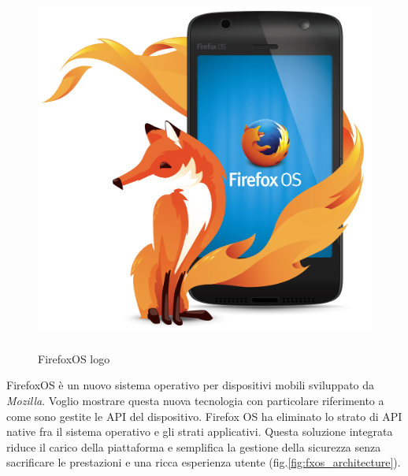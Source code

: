\begin{figure}
	\vspace{-55pt}
	\begin{center}
		\includegraphics[scale=0.075]{Figures/fxos-logo.png}
	\end{center}
	\vspace{0pt}
	\caption{\\FirefoxOS logo}
	\label{fig:fxos_logo}
	\vspace{0pt}
\end{figure}

FirefoxOS è un nuovo sistema operativo per dispositivi mobili sviluppato da \emph{Mozilla}. Voglio mostrare questa nuova tecnologia con particolare riferimento a come sono gestite le API del dispositivo. Firefox OS ha eliminato lo strato di API native fra il sistema operativo e gli strati applicativi. Questa soluzione integrata riduce il carico della piattaforma e semplifica la gestione della sicurezza senza sacrificare le prestazioni e una ricca esperienza utente (fig.\ref{fig:fxos_architecture}).

